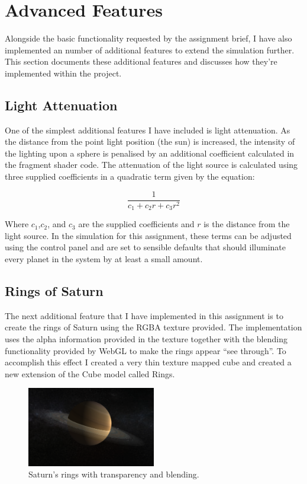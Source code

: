 \documentclass[paper=a4, fontsize=11pt]{scrartcl}	%
\numberwithin{equation}{section}															%
\numberwithin{figure}{section}																%
\numberwithin{table}{section}																%
\begin{document}
\section{Advanced Features}
\label{sec:advanced-features}
Alongside the basic functionality requested by the assignment brief, I have also implemented an number of additional features to extend the simulation further. This section documents these additional features and discusses how they're implemented within the project.

\subsection{Light Attenuation}
One of the simplest additional features I have included is light attenuation. As the distance from the point light position (the sun) is increased, the intensity of the lighting upon a sphere is penalised by an additional coefficient calculated in the fragment shader code.  The attenuation of the light source is calculated using three supplied coefficients in a  quadratic term given by the equation:

\begin{equation}
\frac{1}{c_1 + c_2r + c_3r^2}
\end{equation}

Where $c_1$,$c_2$, and $c_3$ are the supplied coefficients and $r$ is the distance from the light source. In the simulation for this assignment, these terms can be adjusted using the control panel and are set to sensible defaults that should illuminate every planet in the system by at least a small amount.

\subsection{Rings of Saturn}
The next additional feature that I have implemented in this assignment is to create the rings of Saturn using the RGBA texture provided. The implementation uses the alpha information provided in the texture together with the blending functionality provided by WebGL to make the rings appear ``see through''. To accomplish this effect I created a very thin texture mapped cube and created a new extension of the Cube model called Rings. 

\begin{figure}[H]
\centering
\includegraphics[width=0.5\textwidth]{img/saturns_rings.png}
\caption{Saturn's rings with transparency and blending.}
\label{fig:saturns-rings}
\end{figure}
\end{document}
